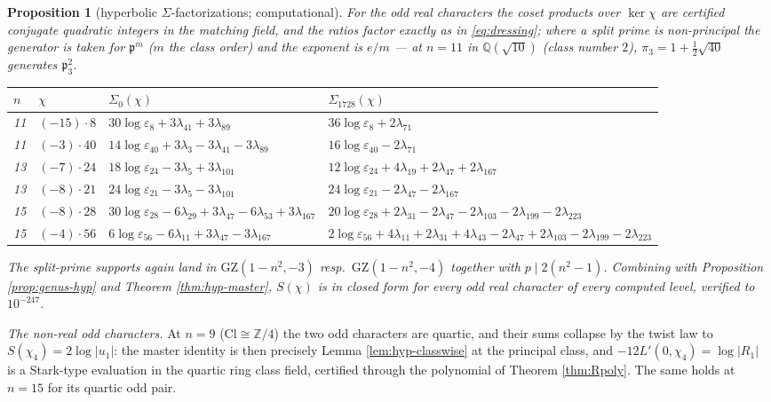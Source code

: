 \documentclass[11pt]{amsart}
\numberwithin{equation}{section}
\theoremstyle{plain}
\newtheorem{proposition}[theorem]{Proposition}
\theoremstyle{definition}
\theoremstyle{remark}
\newcommand{\Q}{\mathbb{Q}}
\newcommand{\Z}{\mathbb{Z}}
\newcommand{\Cl}{\mathrm{Cl}}
\newcommand{\idealp}{\mathfrak{p}}
\newcommand{\GZ}{\mathrm{GZ}}
\newcommand{\eps}{\varepsilon}
\begin{document}
\begin{proposition}[hyperbolic $\Sigma$-factorizations; computational]
\label{prop:dressing-hyp}
For the odd real characters the coset products over $\ker\chi$ are
certified conjugate quadratic integers in the matching field, and the
ratios factor exactly as in \eqref{eq:dressing}; where a split prime is
non-principal the generator is taken for $\idealp^m$ ($m$ the class
order) and the exponent is $e/m$ --- at $n = 11$ in $\Q(\sqrt{10})$ (class
number $2$), $\pi_3 = 1 + \tfrac12\sqrt{40}$ generates $\idealp_3^2$.
\begin{center}
\footnotesize
\setlength{\tabcolsep}{3pt}
\begin{tabular}{@{}llp{4.8cm}p{5.3cm}@{}}
\toprule
$n$ & $\chi$ & $\Sigma_0(\chi)$ & $\Sigma_{1728}(\chi)$\\
\midrule
11 & $(-15)\cdot8$ & $30\log\eps_8 + 3\lambda_{41} + 3\lambda_{89}$ &
$36\log\eps_8 + 2\lambda_{71}$\\
11 & $(-3)\cdot40$ & $14\log\eps_{40} + 3\lambda_3 - 3\lambda_{41} -
3\lambda_{89}$ & $16\log\eps_{40} - 2\lambda_{71}$\\
13 & $(-7)\cdot24$ & $18\log\eps_{24} - 3\lambda_5 + 3\lambda_{101}$ &
$12\log\eps_{24} + 4\lambda_{19} + 2\lambda_{47} + 2\lambda_{167}$\\
13 & $(-8)\cdot21$ & $24\log\eps_{21} - 3\lambda_5 - 3\lambda_{101}$ &
$24\log\eps_{21} - 2\lambda_{47} - 2\lambda_{167}$\\
15 & $(-8)\cdot28$ & $30\log\eps_{28} - 6\lambda_{29} + 3\lambda_{47} -
6\lambda_{53} + 3\lambda_{167}$ & $20\log\eps_{28} + 2\lambda_{31} -
2\lambda_{47} - 2\lambda_{103} - 2\lambda_{199} - 2\lambda_{223}$\\
15 & $(-4)\cdot56$ & $6\log\eps_{56} - 6\lambda_{11} + 3\lambda_{47} -
3\lambda_{167}$ & $2\log\eps_{56} + 4\lambda_{11} + 2\lambda_{31} +
4\lambda_{43} - 2\lambda_{47} + 2\lambda_{103} - 2\lambda_{199} -
2\lambda_{223}$\\
\bottomrule
\end{tabular}
\end{center}
The split-prime supports again land in $\GZ(1 - n^2, -3)$ resp.\
$\GZ(1 - n^2, -4)$ together with $p \mid 2(n^2 - 1)$.  Combining with
Proposition \ref{prop:genus-hyp} and Theorem \ref{thm:hyp-master},
$S(\chi)$ is in closed form for every odd real character of every
computed level, verified to $10^{-247}$.
\end{proposition}

\emph{The non-real odd characters.}  At $n = 9$ ($\Cl \cong \Z/4$) the
two odd characters are quartic, and their sums collapse by the twist law
to $S(\chi_4) = 2\log|u_1|$: the master identity is then precisely
Lemma \ref{lem:hyp-classwise} at the principal class, and $-12L'(0,\chi_4)
= \log|R_1|$ is a Stark-type evaluation in the quartic ring class field,
certified through the polynomial of Theorem \ref{thm:Rpoly}.  The same
holds at $n = 15$ for its quartic odd pair.
\end{document}

